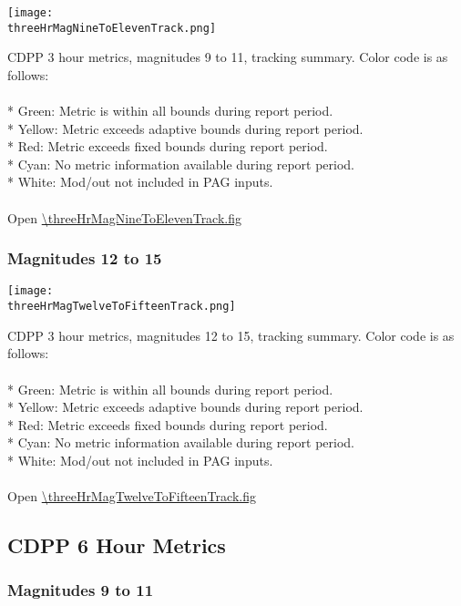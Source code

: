 \begin{center}
\texttt{[image: \\threeHrMagNineToElevenTrack.png]}
\end{center}
CDPP 3 hour metrics, magnitudes 9 to 11, tracking summary. Color code is as follows:\\
\\
* Green: Metric is within all bounds during report period.\\
* Yellow: Metric exceeds adaptive bounds during report period.\\
* Red: Metric exceeds fixed bounds during report period.\\
* Cyan: No metric information available during report period.\\
* White: Mod/out not included in PAG inputs.\\
\\
Open \url{\threeHrMagNineToElevenTrack.fig}

\newpage

\subsubsection{Magnitudes 12 to 15}

\begin{center}
\texttt{[image: \\threeHrMagTwelveToFifteenTrack.png]}
\end{center}
CDPP 3 hour metrics, magnitudes 12 to 15, tracking summary. Color code is as follows:\\
\\
* Green: Metric is within all bounds during report period.\\
* Yellow: Metric exceeds adaptive bounds during report period.\\
* Red: Metric exceeds fixed bounds during report period.\\
* Cyan: No metric information available during report period.\\
* White: Mod/out not included in PAG inputs.\\
\\
Open \url{\threeHrMagTwelveToFifteenTrack.fig}

\newpage

\subsection{CDPP 6 Hour Metrics}

\subsubsection{Magnitudes 9 to 11}

